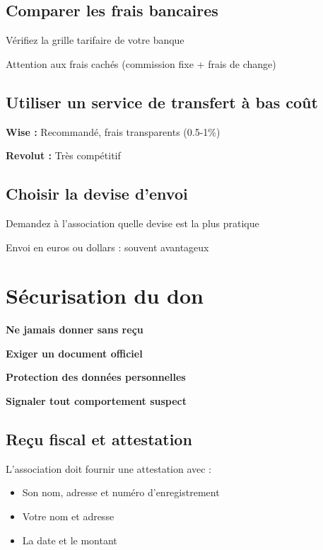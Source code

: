 \documentclass[12pt, a4paper]{article}
\begin{document}
\subsection{Comparer les frais bancaires}
\begin{starredlist}
    \item Vérifiez la grille tarifaire de votre banque
    \item Attention aux frais cachés (commission fixe + frais de change)
\end{starredlist}

\subsection{Utiliser un service de transfert à bas coût}
\begin{starredlist}
    \item \textbf{Wise :} Recommandé, frais transparents (0.5-1\%)
    \item \textbf{Revolut :} Très compétitif
\end{starredlist}

\subsection{Choisir la devise d'envoi}
\begin{starredlist}
    \item Demandez à l'association quelle devise est la plus pratique
    \item Envoi en euros ou dollars : souvent avantageux
\end{starredlist}

\newpage

\section{Sécurisation du don}

\begin{checklist}
    \item \textbf{Ne jamais donner sans reçu}
    \item \textbf{Exiger un document officiel}
    \item \textbf{Protection des données personnelles}
    \item \textbf{Signaler tout comportement suspect}
\end{checklist}

\subsection{Reçu fiscal et attestation}
\begin{arrowlist}
    \item L'association doit fournir une attestation avec :
    \begin{itemize}
        \item Son nom, adresse et numéro d'enregistrement
        \item Votre nom et adresse
        \item La date et le montant
    \end{itemize}
\end{arrowlist}
\end{document}
